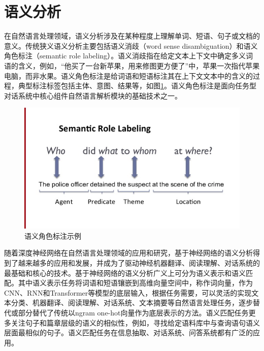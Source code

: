 \section{语义分析}
在自然语言处理领域，语义分析涉及在某种程度上理解单词、短语、句子或文档的意义。传统狭义语义分析主要包括语义消歧（word sense disambiguation）\cite{ yarowsky1995unsupervised}和语义角色标注（semantic role labeling）\cite{ carreras2005introduction, bjorkelund2009multilingual}。语义消歧指在给定文本上下文中确定多义词语的含义，例如，“他买了一台新苹果，用来修图更方便了”中，苹果一次指代苹果电脑，而非水果。语义角色标注是给词语和短语标注其在上下文文本中的含义的过程，典型标注标签包括主体、意图、结果等，如图\ref{fig:semantic_role_label}。语义角色标注是面向任务型对话系统中核心组件自然语言解析模块的基础技术之一。

\begin{figure}[h]
\centering
\includegraphics[scale=1]{img/chapter_nlp/guang_analysis_1.png}
\caption{语义角色标注示例}
\label{fig:semantic_role_label}
\end{figure}

随着深度神经网络在自然语言处理领域的应用和研究，基于神经网络的语义分析得到了越来越多的应用和发展，并成为了驱动神经机器翻译\cite{ bahdanau2014neural, luong2015effective}、阅读理解\cite{ hermann2015teaching}、对话系统\cite{ serban2016building, chen2017survey}的最基础和核心的技术。基于神经网络的语义分析广义上可分为语义表示和语义匹配。其中语义表示任务将词语和短语镶嵌到高维向量空间中，称作词向量，作为CNN\cite{ lecun1995convolutional}、RNN\cite{ hochreiter1997long}和Transformer\cite{ vaswani2017attention}等模型的底层输入，根据任务需要，可以灵活的实现文本分类\cite{ joulin2016bag, zhang2015character}、机器翻译、阅读理解、对话系统、文本摘要\cite{ tan2017abstractive, yao2017recent}等自然语言处理任务，逐步替代或部分替代了传统以ngram one-hot向量作为底层表示的方法。语义匹配任务更多关注句子和篇章层级的语义的相似性，例如，寻找给定语料库中与查询语句语义层面最相似的句子。语义匹配任务在信息抽取、对话系统、问答系统都有广泛的应用。

